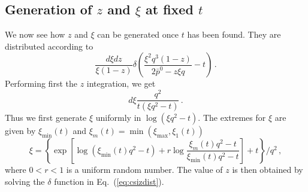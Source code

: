 \documentclass[11pt,a4paper]{article}
\begin{document}
\subsection{Generation of $z$ and $\xi$ at fixed $t$}

We now see how $z$ and $\xi$ can be generated once $t$ has been found. They
are distributed according to
\begin{equation}
  \frac{d \xi dz}{\xi (1 - z)} \delta \left( \frac{\xi^2 q^3 (1 - z)}{2
  \bar{p}^0 - z \xi q} - t \right) \,. \label{eq:csizdist}
\end{equation}
Performing first the $z$ integration, we get
\begin{equation}
  d \xi \frac{q^2}{t (\xi q^2 - t)} \, .
\end{equation}
Thus we first generate $\xi$ uniformly in $\log (\xi q^2 - t)$. The extremes
for $\xi$ are given by $\xi_{\min} (t)$ and $\xi_m (t) = \min (\xi_{\max},
\xi_1 (t))$
\begin{equation}
  \xi = \left\{ \exp \left[ \log (\xi_{\min} (t) q^2 - t) + r \log \frac{\xi_m
  (t) q^2 - t}{\xi_{\min} (t) q^2 - t} \right] + t \right\} / q^2 \, ,
\end{equation}
where $0 < r < 1$ is a uniform random number. The value of $z$ is then
obtained by solving the $\delta$ function in Eq.~(\ref{eq:csizdist}).



\end{document}
